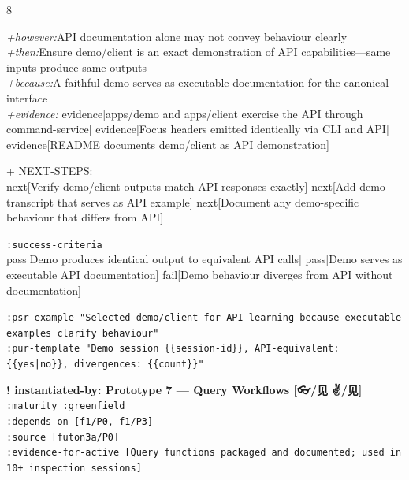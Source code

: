 \documentclass[landscape]{article}
\newcommand{\flexitag}[1]{\textcolor[gray]{0.35}{\textit{#1}}}
\newenvironment{devmapactive}{%
  \def\FrameCommand{\colorbox{devmapactivebg}}%
  \setlength{\fboxsep}{2pt}%
  \MakeFramed{\advance\hsize-\width \FrameRestore}%
}{\endMakeFramed}
\newenvironment{devmapgreenfield}{%
  \def\FrameCommand{\colorbox{devmapgreenfieldbg}}%
  \setlength{\fboxsep}{2pt}%
  \MakeFramed{\advance\hsize-\width \FrameRestore}%
}{\endMakeFramed}
\begin{document}
\begin{paracol}{8}
\begin{devmapactive}
  \flexitag{+however:}API documentation alone may not convey behaviour clearly\\
  \flexitag{+then:}Ensure demo/client is an exact demonstration of API capabilities—same inputs produce same outputs\\
  \flexitag{+because:}A faithful demo serves as executable documentation for the canonical interface\\
  \flexitag{+evidence:} evidence[apps/demo and apps/client exercise the API through command-service] evidence[Focus headers emitted identically via CLI and API] evidence[README documents demo/client as API demonstration]\\
\par
  + NEXT-STEPS:\\
    next[Verify demo/client outputs match API responses exactly] next[Add demo transcript that serves as API example] next[Document any demo-specific behaviour that differs from API]\\
\par
  \texttt{:\allowbreak{}success-\allowbreak{}criteria}\\
    pass[Demo produces identical output to equivalent API calls] pass[Demo serves as executable API documentation] fail[Demo behaviour diverges from API without documentation]\\
\par
  \texttt{:\allowbreak{}psr-\allowbreak{}example "Selected demo/\allowbreak{}client for API learning because executable examples clarify behaviour"}\\
  \texttt{:\allowbreak{}pur-\allowbreak{}template "Demo session \{\{session-\allowbreak{}id\}\},\allowbreak{} API-\allowbreak{}equivalent:\allowbreak{} \{\{yes|\allowbreak{}no\}\},\allowbreak{} divergences:\allowbreak{} \{\{count\}\}"}\\
\par
\par
\end{devmapactive}
\begin{devmapgreenfield}
\textbf{! instantiated-by: Prototype 7 — Query Workflows [👓/见 ✌️/见]}\\
  \texttt{:\allowbreak{}maturity :\allowbreak{}greenfield}\\
  \texttt{:\allowbreak{}depends-\allowbreak{}on [f1/\allowbreak{}P0,\allowbreak{} f1/\allowbreak{}P3]}\\
  \texttt{:\allowbreak{}source [futon3a/\allowbreak{}P0]}\\
  \texttt{:\allowbreak{}evidence-\allowbreak{}for-\allowbreak{}active [Query functions packaged and documented;\allowbreak{} used in 10+\allowbreak{} inspection sessions]}\\

\end{devmapgreenfield}
\end{paracol}
\end{document}
